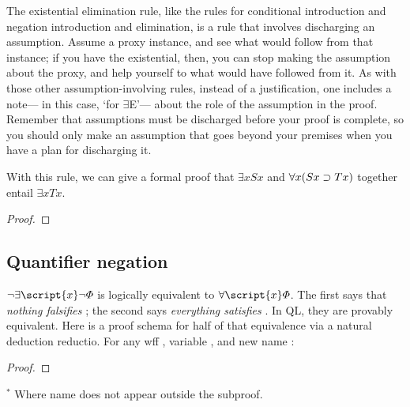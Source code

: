 The existential elimination rule, like the rules for conditional introduction and negation introduction and elimination, is a rule that involves discharging an assumption. Assume a proxy instance, and see what would follow from that instance; if you have the existential, then, you can stop making the assumption about the proxy, and help yourself to what would have followed from it. As with those other assumption-involving rules, instead of a justification, one includes a note--- in this case, `for $\exists${}E'--- about the role of the assumption in the proof. Remember that assumptions must be discharged before your proof is complete, so you should only make an assumption that goes beyond your premises when you have a plan for discharging it.


With this rule, we can give a formal proof that $\exists x Sx$ and $\forall x(Sx \supset Tx)$ together entail $\exists x Tx$.

\begin{proof}
	\open
		 
	\close
\end{proof}

\subsection{Quantifier negation}

$\enot\exists \script{x}\enot\metaA{}$ is logically equivalent to $\forall \script{x}\metaA{}$. The first says that \emph{nothing falsifies} \metaA{}; the second says \emph{everything satisfies} \metaA{}. In QL, they are provably equivalent. Here is a proof schema for half of that equivalence via a natural deduction reductio. For any wff \metaA{}, variable , and new name :


\begin{proof}
	 
	\open
		\open
			\open
			\close
		\close
		\close
\end{proof}
$^\ast$ Where name  does not appear outside the subproof.

